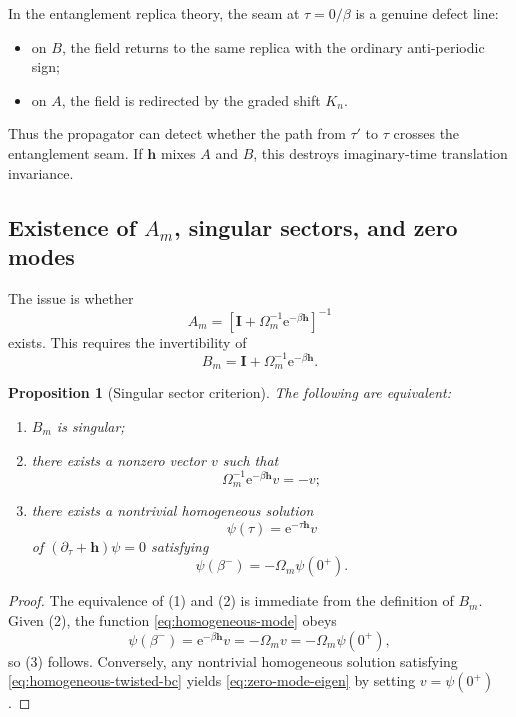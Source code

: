 \documentclass[11pt]{article}
\newtheorem{proposition}{Proposition}
\newcommand{\e}{\mathrm{e}}
\newcommand{\1}{\mathds{1}}
\newcommand{\bh}{\bm{h}}
\newcommand{\bI}{\bm{I}}
\newcommand{\sq}[1]{\left[#1\right]}
\begin{document}
In the entanglement replica theory, the seam at $\tau=0/\beta$ is a genuine
defect line:
\begin{itemize}[leftmargin=2em]
\item on $B$, the field returns to the same replica with the ordinary
anti-periodic sign;
\item on $A$, the field is redirected by the graded shift $K_n$.
\end{itemize}
Thus the propagator can detect whether the path from $\tau'$ to $\tau$ crosses
the entanglement seam. If $\bh$ mixes $A$ and $B$, this destroys imaginary-time
translation invariance.

\subsection{Existence of $A_m$, singular sectors, and zero modes}

The issue is whether
\begin{equation}
A_m=\sq{\bI+\Omega_m^{-1}\e^{-\beta\bh}}^{-1}
\label{eq:Am-existence}
\end{equation}
exists. This requires the invertibility of
\begin{equation}
B_m=\bI+\Omega_m^{-1}\e^{-\beta\bh}.
\label{eq:Bm-existence}
\end{equation}

\begin{proposition}[Singular sector criterion]
The following are equivalent:
\begin{enumerate}[leftmargin=2.2em]
\item $B_m$ is singular;
\item there exists a nonzero vector $v$ such that
\begin{equation}
\Omega_m^{-1}\e^{-\beta\bh}v=-v;
\label{eq:zero-mode-eigen}
\end{equation}
\item there exists a nontrivial homogeneous solution
\begin{equation}
\psi(\tau)=\e^{-\tau\bh}v
\label{eq:homogeneous-mode}
\end{equation}
of $(\partial_\tau+\bh)\psi=0$ satisfying
\begin{equation}
\psi(\beta^-)=-\Omega_m\psi(0^+).
\label{eq:homogeneous-twisted-bc}
\end{equation}
\end{enumerate}
\label{prop:zero-mode}
\end{proposition}

\begin{proof}
The equivalence of (1) and (2) is immediate from the definition of $B_m$.
Given (2), the function \eqref{eq:homogeneous-mode} obeys
\[
\psi(\beta^-)=\e^{-\beta\bh}v=-\Omega_m v=-\Omega_m\psi(0^+),
\]
so (3) follows. Conversely, any nontrivial homogeneous solution satisfying
\eqref{eq:homogeneous-twisted-bc} yields \eqref{eq:zero-mode-eigen} by setting
$v=\psi(0^+)$.
\end{proof}
\end{document}
